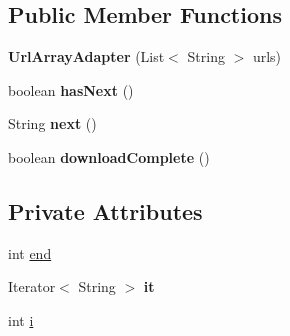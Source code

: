 \subsection*{Public Member Functions}
\begin{DoxyCompactItemize}
\item 
{\bfseries Url\+Array\+Adapter} (List$<$ String $>$ urls)\hypertarget{classcom_1_1example_1_1sebastian_1_1tindertp_1_1UrlArrayAdapter_a6632b82dc47c257f7beaa50778b1d3dd}{}\label{classcom_1_1example_1_1sebastian_1_1tindertp_1_1UrlArrayAdapter_a6632b82dc47c257f7beaa50778b1d3dd}

\item 
boolean {\bfseries has\+Next} ()\hypertarget{classcom_1_1example_1_1sebastian_1_1tindertp_1_1UrlArrayAdapter_a2efbf2b83d0af47cf66470c4472c2b7f}{}\label{classcom_1_1example_1_1sebastian_1_1tindertp_1_1UrlArrayAdapter_a2efbf2b83d0af47cf66470c4472c2b7f}

\item 
String {\bfseries next} ()\hypertarget{classcom_1_1example_1_1sebastian_1_1tindertp_1_1UrlArrayAdapter_a8d2ae5e2905a5bdac61d1032698171bc}{}\label{classcom_1_1example_1_1sebastian_1_1tindertp_1_1UrlArrayAdapter_a8d2ae5e2905a5bdac61d1032698171bc}

\item 
boolean {\bfseries download\+Complete} ()\hypertarget{classcom_1_1example_1_1sebastian_1_1tindertp_1_1UrlArrayAdapter_a6f33b18b9d01436be6f318ea12f08825}{}\label{classcom_1_1example_1_1sebastian_1_1tindertp_1_1UrlArrayAdapter_a6f33b18b9d01436be6f318ea12f08825}

\end{DoxyCompactItemize}
\subsection*{Private Attributes}
\begin{DoxyCompactItemize}
\item 
int \hyperlink{classcom_1_1example_1_1sebastian_1_1tindertp_1_1UrlArrayAdapter_a8417684fea5fdac9a0b1678f1be908c4}{end}
\item 
Iterator$<$ String $>$ {\bfseries it}\hypertarget{classcom_1_1example_1_1sebastian_1_1tindertp_1_1UrlArrayAdapter_a9031519fcff0b68b8c304e8e796e746c}{}\label{classcom_1_1example_1_1sebastian_1_1tindertp_1_1UrlArrayAdapter_a9031519fcff0b68b8c304e8e796e746c}

\item 
int \hyperlink{classcom_1_1example_1_1sebastian_1_1tindertp_1_1UrlArrayAdapter_a6808a701ca3d7424cca32e2fc4153eb4}{i}
\end{DoxyCompactItemize}



